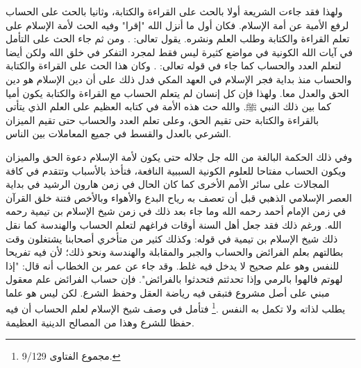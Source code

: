 ولهذا فقد جاءت الشريعة أولا بالحث على القراءة والكتابة، وثانيا بالحث على الحساب لرفع الأمية عن أمة الإسلام. فكان أول ما أنزل الله "إقرا" وفيه الحث لأمة الإسلام على تعلم القراءة والكتابة وطلب العلم ونشره. يقول تعالى:
\quranayah*[96][1-5]{\footnotesize \surahname*[96]}.
ومن ثم جاء الحث على التأمل في آيات الله الكونية في مواضع كثيرة ليس فقط لمجرد التفكر في خلق الله ولكن أيضا لتعلم العدد والحساب كما جاء في قوله تعالى:
\quranayah*[10][5]{\footnotesize \surahname*[10]}. وكان هذا الحث على القراءة والكتابة والحساب منذ بداية فجر الإسلام في العهد المكي فدل ذلك على أن دين الإسلام هو دين الحق والعدل معا. ولهذا فإن كل إنسان لم يتعلم الحساب مع القراءة والكتابة يكون أميا كما بين ذلك النبي ﷺ. والله حث هذه الأمة في كتابه العظيم على العلم الذي يتأتى بالقراءة والكتابة حتى تقيم الحق، وعلى تعلم العدد والحساب حتى تقيم الميزان الشرعي بالعدل والقسط في جميع المعاملات بين الناس. 

وفي ذلك الحكمة البالغة من الله جل جلاله حتى يكون لأمة الإسلام دعوة الحق والميزان ويكون الحساب مفتاحا للعلوم الكونية السببية النافعة، فتأخذ بالأسباب وتتقدم في كافة المجالات على سائر الأمم الأخرى كما كان الحال في زمن هارون الرشيد في بداية العصر الإسلامي الذهبي قبل أن تعصف به رياح البدع والأهواء وبالأخص فتنة خلق القرآن في زمن الإمام أحمد رحمه الله وما جاء بعد ذلك في زمن شيخ الإسلام بن تيمية رحمه الله. ورغم ذلك فقد جعل أهل السنة أوقات فراغهم لتعلم الحساب والهندسة كما نقل ذلك شيخ الإسلام بن تيمية في قوله: وكذلك كثير من متأخري أصحابنا يشتغلون وقت بطالتهم بعلم الفرائض والحساب والجبر والمقابلة والهندسة ونحو ذلك؛ لأن فيه تفريحا للنفس وهو علم صحيح لا يدخل فيه غلط. وقد جاء عن عمر بن الخطاب أنه قال: "إذا لهوتم فالهوا بالرمي وإذا تحدثتم فتحدثوا بالفرائض". فإن حساب الفرائض علم معقول مبني على أصل مشروع فتبقى فيه رياضة العقل وحفظ الشرع. لكن ليس هو علما يطلب لذاته ولا تكمل به النفس \href{https://shamela.ws/book/7289/4394#p1}{\faExternalLink} \cite{ibnTaimia_Majmoo}.\footnote{مجموع الفتاوى 9/129.} فتأمل في وصف شيخ الإسلام لعلم الحساب أن فيه حفظا للشرع وهذا من المصالح الدينية العظيمة.

